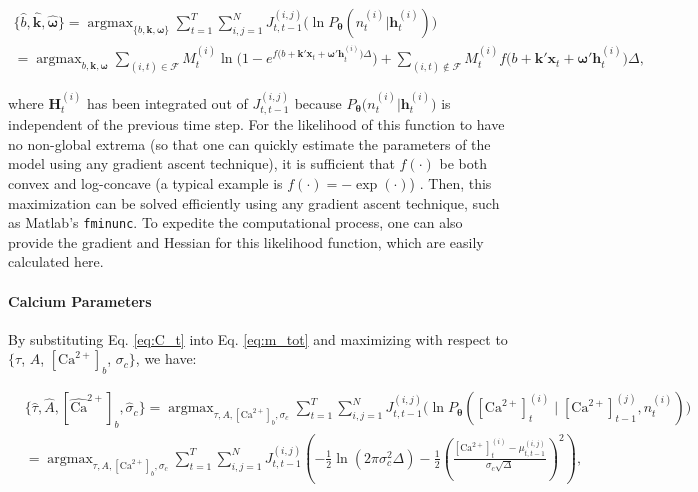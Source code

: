 \documentclass[10pt]{article}
\providecommand{\ve}[1]{\boldsymbol{#1}}
\providecommand{\ve}[1]{\boldsymbol{#1}}
\DeclareMathOperator*{\argmax}{argmax}
\newcommand{\thetn}{\ve{\theta}}
\newcommand{\p}{P_{\thetn}}
\newcommand{\Ca}{[\text{Ca}^{2+}]}
\newcommand{\wCab}{[\widehat{\text{Ca}}^{2+}]_b}
\begin{document}
\begin{multline} \label{eq:spike_params}
\{\widehat{b},\widehat{\ve{k}},\widehat{\ve{\omega}}\} = \argmax_{\{b, \ve{k}, \ve{\omega}\}} \sum_{t=1}^T \sum_{i,j=1}^N J^{(i,j)}_{t,t-1}  \big( \ln \p (n_t^{(i)} | \ve{h}_t^{(i)})\big)
\\=\argmax_{b,\ve{k},\ve{\omega}} \sum_{(i,t) \in \mathcal{F}} M^{(i)}_t \ln \bigg(1-e^{f\big(b+\ve{k}' \ve{x}_t+\ve{\omega}' \ve{h}_t^{(i)}\big) \Delta}\bigg) + \sum_{(i,t) \notin \mathcal{F}} M^{(i)}_t f\big(b + \ve{k}' \ve{x}_t +\ve{\omega}' \ve{h}_t^{(i)}\big) \Delta,
\end{multline}

\noindent where $\ve{H}_{t}^{(i)}$ has been integrated out of $J_{t,t-1}^{(i,j)}$ because $\p\big(n_t^{(i)} | \ve{h}_t^{(i)}\big)$ is independent of the previous time step.  For the likelihood of this function to have no non-global extrema (so that one can quickly estimate the parameters of the model using any gradient ascent technique), it is sufficient that $f(\cdot)$ be both convex and log-concave (a typical example is $f(\cdot)= -\exp(\cdot)$) \cite{EscolaPaninski07}.  Then, this maximization can be solved efficiently using any gradient ascent technique, such as Matlab's \texttt{fminunc}.  To expedite the computational process, one can also provide the gradient and Hessian for this likelihood function, which are easily calculated here.

\paragraph{Calcium Parameters}

By substituting Eq. \ref{eq:C_t} into Eq. \ref{eq:m_tot} and maximizing with respect to $\{\tau$, $A$, $\Ca_b$, $\sigma_c\}$, we have:

\begin{align} %
&\{\widehat{\tau},\widehat{A}, \wCab, \widehat{\sigma}_c\}
= \argmax_{\tau, A, \Ca_b, \sigma_c} \sum_{t=1}^T \sum_{i,j=1}^N J^{(i,j)}_{t,t-1}  \big( \ln \p (\Ca_t^{(i)} \mid \Ca_{t-1}^{(j)}, n_t^{(i)}) \big) \nonumber
\\&= \argmax_{\tau,A,\Ca_b,\sigma_c} \sum_{t=1}^T \sum_{i,j=1}^N J^{(i,j)}_{t,t-1} %
 \left(-\frac{1}{2} \ln (2 \pi \sigma_c^2 \Delta) -\frac{1}{2} \left(\frac{\Ca_t^{(i)} - \mu_{t,t-1}^{(i,j)}}{\sigma_c \sqrt{\Delta}}\right)^2\right), \label{eq:c_t2}
\end{align}
\end{document}

